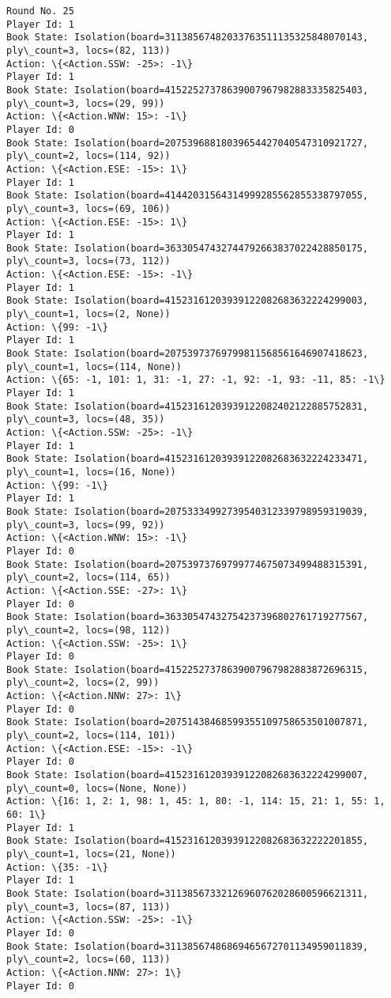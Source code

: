 \documentclass[11pt]{article}
\begin{document}
\begin{Verbatim}[commandchars=\\\{\}]
Round No. 25
Player Id: 1
Book State: Isolation(board=31138567482033763511135325848070143, ply\_count=3, locs=(82, 113))
Action: \{<Action.SSW: -25>: -1\}
Player Id: 1
Book State: Isolation(board=41522527378639007967982883335825403, ply\_count=3, locs=(29, 99))
Action: \{<Action.WNW: 15>: -1\}
Player Id: 0
Book State: Isolation(board=20753968818039654427040547310921727, ply\_count=2, locs=(114, 92))
Action: \{<Action.ESE: -15>: 1\}
Player Id: 1
Book State: Isolation(board=41442031564314999285562855338797055, ply\_count=3, locs=(69, 106))
Action: \{<Action.ESE: -15>: 1\}
Player Id: 1
Book State: Isolation(board=36330547432744792663837022428850175, ply\_count=3, locs=(73, 112))
Action: \{<Action.ESE: -15>: -1\}
Player Id: 1
Book State: Isolation(board=41523161203939122082683632224299003, ply\_count=1, locs=(2, None))
Action: \{99: -1\}
Player Id: 1
Book State: Isolation(board=20753973769799811568561646907418623, ply\_count=1, locs=(114, None))
Action: \{65: -1, 101: 1, 31: -1, 27: -1, 92: -1, 93: -11, 85: -1\}
Player Id: 1
Book State: Isolation(board=41523161203939122082402122885752831, ply\_count=3, locs=(48, 35))
Action: \{<Action.SSW: -25>: -1\}
Player Id: 1
Book State: Isolation(board=41523161203939122082683632224233471, ply\_count=1, locs=(16, None))
Action: \{99: -1\}
Player Id: 1
Book State: Isolation(board=20753334992739540312339798959319039, ply\_count=3, locs=(99, 92))
Action: \{<Action.WNW: 15>: -1\}
Player Id: 0
Book State: Isolation(board=20753973769799774675073499488315391, ply\_count=2, locs=(114, 65))
Action: \{<Action.SSE: -27>: 1\}
Player Id: 0
Book State: Isolation(board=36330547432754237396802761719277567, ply\_count=2, locs=(98, 112))
Action: \{<Action.SSW: -25>: 1\}
Player Id: 0
Book State: Isolation(board=41522527378639007967982883872696315, ply\_count=2, locs=(2, 99))
Action: \{<Action.NNW: 27>: 1\}
Player Id: 0
Book State: Isolation(board=20751438468599355109758653501007871, ply\_count=2, locs=(114, 101))
Action: \{<Action.ESE: -15>: -1\}
Player Id: 0
Book State: Isolation(board=41523161203939122082683632224299007, ply\_count=0, locs=(None, None))
Action: \{16: 1, 2: 1, 98: 1, 45: 1, 80: -1, 114: 15, 21: 1, 55: 1, 60: 1\}
Player Id: 1
Book State: Isolation(board=41523161203939122082683632222201855, ply\_count=1, locs=(21, None))
Action: \{35: -1\}
Player Id: 1
Book State: Isolation(board=31138567332126960762028600596621311, ply\_count=3, locs=(87, 113))
Action: \{<Action.SSW: -25>: -1\}
Player Id: 0
Book State: Isolation(board=31138567486869465672701134959011839, ply\_count=2, locs=(60, 113))
Action: \{<Action.NNW: 27>: 1\}
Player Id: 0

\end{Verbatim}
\end{document}
